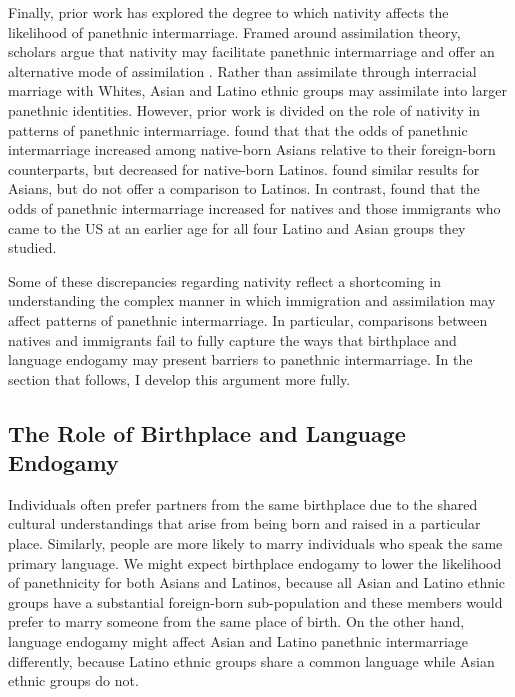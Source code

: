 \documentclass[11pt,]{article}
\begin{document}
Finally, prior work has explored the degree to which nativity affects the likelihood of panethnic intermarriage. Framed around assimilation theory, scholars argue that nativity may facilitate panethnic intermarriage and offer an alternative mode of assimilation \citep[p.~673]{qian_crossing_2012}. Rather than assimilate through interracial marriage with Whites, Asian and Latino ethnic groups may assimilate into larger panethnic identities. However, prior work is divided on the role of nativity in patterns of panethnic intermarriage. \citet{rosenfeld_salience_2001} found that that the odds of panethnic intermarriage increased among native-born Asians relative to their foreign-born counterparts, but decreased for native-born Latinos. \citet{qian_asian_2001} found similar results for Asians, but do not offer a comparison to Latinos. In contrast, \citet{qian_crossing_2012} found that the odds of panethnic intermarriage increased for natives and those immigrants who came to the US at an earlier age for all four Latino and Asian groups they studied.

Some of these discrepancies regarding nativity reflect a shortcoming in understanding the complex manner in which immigration and assimilation may affect patterns of panethnic intermarriage. In particular, comparisons between natives and immigrants fail to fully capture the ways that birthplace and language endogamy may present barriers to panethnic intermarriage. In the section that follows, I develop this argument more fully.

\hypertarget{the-role-of-birthplace-and-language-endogamy}{%
\subsection{The Role of Birthplace and Language Endogamy}\label{the-role-of-birthplace-and-language-endogamy}}

Individuals often prefer partners from the same birthplace due to the shared cultural understandings that arise from being born and raised in a particular place. Similarly, people are more likely to marry individuals who speak the same primary language. We might expect birthplace endogamy to lower the likelihood of panethnicity for both Asians and Latinos, because all Asian and Latino ethnic groups have a substantial foreign-born sub-population and these members would prefer to marry someone from the same place of birth. On the other hand, language endogamy might affect Asian and Latino panethnic intermarriage differently, because Latino ethnic groups share a common language while Asian ethnic groups do not.
\end{document}
